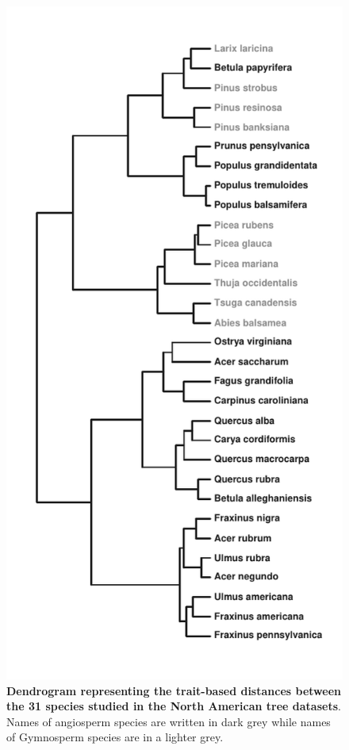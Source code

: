 \newpage

\begin{figure}
\centering
\includegraphics{chapitre3/figS2.pdf}
\caption{\textbf{Dendrogram representing the trait-based distances
between the 31 species studied in the North American tree datasets}.
Names of angiosperm species are written in dark grey while names of
Gymnosperm species are in a lighter grey.\label{fig:dendro}}
\end{figure}

